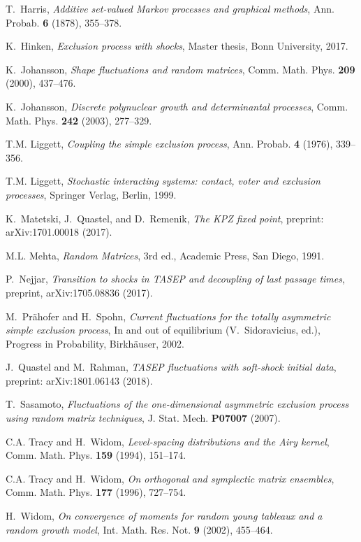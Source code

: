 \documentclass[12pt,a4paper]{article}
\numberwithin{equation}{section}
\begin{document}
\begin{thebibliography}{10}
T.~Harris, \emph{{Additive set-valued Markov processes and graphical methods}},
  Ann. Probab. \textbf{6} (1878), 355--378.

K.~Hinken, \emph{{Exclusion process with shocks}}, Master thesis, Bonn
  University, 2017.

K.~Johansson, \emph{Shape fluctuations and random matrices}, Comm. Math. Phys.
  \textbf{209} (2000), 437--476.

K.~Johansson, \emph{Discrete polynuclear growth and determinantal processes},
  Comm. Math. Phys. \textbf{242} (2003), 277--329.

T.M. Liggett, \emph{Coupling the simple exclusion process}, Ann. Probab.
  \textbf{4} (1976), 339--356.

T.M. Liggett, \emph{Stochastic interacting systems: contact, voter and
  exclusion processes}, Springer Verlag, Berlin, 1999.

K.~Matetski, J.~Quastel, and D.~Remenik, \emph{{The KPZ fixed point}},
  preprint: arXiv:1701.00018 (2017).

M.L. Mehta, \emph{{Random Matrices}}, 3rd ed., Academic Press, San Diego, 1991.

P.~Nejjar, \emph{{Transition to shocks in TASEP and decoupling of last passage
  times}}, preprint, arXiv:1705.08836 (2017).

M.~Pr{\"a}hofer and H.~Spohn, \emph{Current fluctuations for the totally
  asymmetric simple exclusion process}, In and out of equilibrium
  (V.~Sidoravicius, ed.), Progress in Probability, Birkh{\"a}user, 2002.

J.~Quastel and M.~Rahman, \emph{{TASEP fluctuations with soft-shock initial
  data}}, preprint: arXiv:1801.06143 (2018).

T.~Sasamoto, \emph{Fluctuations of the one-dimensional asymmetric exclusion
  process using random matrix techniques}, J. Stat. Mech. \textbf{P07007}
  (2007).

C.A. Tracy and H.~Widom, \emph{{Level-spacing distributions and the Airy
  kernel}}, Comm. Math. Phys. \textbf{159} (1994), 151--174.

C.A. Tracy and H.~Widom, \emph{On orthogonal and symplectic matrix ensembles},
  Comm. Math. Phys. \textbf{177} (1996), 727--754.

H.~Widom, \emph{On convergence of moments for random young tableaux and a
  random growth model}, Int. Math. Res. Not. \textbf{9} (2002), 455--464.

\end{thebibliography}

%
%
\end{document}
